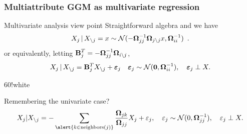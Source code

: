\begin{frame}
  \frametitle{Multiattribute GGM as multivariate regression}

  \begin{block}{Multivariate analysis view point}
    Straightforward algebra and we have
    \begin{equation*}
      \label{eq:condK}
      X_j \, |\,  X_{\backslash j}  = x \sim  \mathcal{N}(- \boldsymbol{\Omega}_{jj}^{-1}\boldsymbol{\Omega}_{j
        \backslash j} x , \boldsymbol{\Omega}_{ii}^{-1})\enskip.
    \end{equation*}
    or   equivalently,    letting   $\displaystyle    \mathbf{B}_j^T   =
    -\boldsymbol{\Omega}_{jj}^{-1} \boldsymbol{\Omega}_{i\backslash j}$,
    \begin{equation*}
      \label{eq:condK}
      X_j \, |\, X_{\backslash j} = \mathbf{B}_j^T X_{\backslash j} +
      \boldsymbol\varepsilon_j \quad \boldsymbol\varepsilon_j
      \sim \mathcal{N}(\mathbf{0},\boldsymbol{\Omega}_{ii}^{-1}), \quad \boldsymbol\varepsilon_j \perp X.
    \end{equation*}
  \end{block}

    \begin{colormixin}{60!white}
      \begin{block}{Remembering the univariate case?}
        \[
        X_j   |    X_{   \setminus    j}   =   -    \sum_{\alert{k   \in
            \text{neighbors}(j)}} \frac{\invcov_{jk}}{\invcov_{jj}}  X_j +
        \varepsilon_j,\quad              \varepsilon_j              \sim
        \mathcal{N}(0,\invcov_{jj}^{-1}), \quad \varepsilon_j \perp X.
        \]
      \end{block}
    \end{colormixin}
\end{frame}

